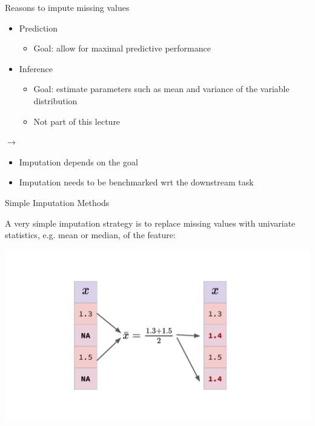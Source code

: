 \documentclass[11pt,compress,t,notes=noshow, xcolor=table]{beamer}
\begin{document}
\begin{frame}{Reasons to impute missing values}
    \vfill
    \begin{itemize}
        \item Prediction
        \begin{itemize}
            \item Goal: allow for maximal predictive performance
        \end{itemize}
        \item Inference
        \begin{itemize}
            \item Goal: estimate parameters such as mean and variance of the variable distribution
            \item Not part of this lecture
        \end{itemize}
    \end{itemize}
    \vfill
    $\rightarrow$ 
    \begin{itemize}
        \item Imputation depends on the goal
        \item Imputation needs to be benchmarked wrt the downstream task
    \end{itemize}
    \vfill
\end{frame}

\begin{frame}{Simple Imputation Methods}

    A very simple imputation strategy is to replace missing values with univariate statistics, e.g. mean or median, of the feature:
    
    \begin{center}
        \includegraphics[width=\textwidth]{figure_man/fe_imputation_simple.pdf}
    \end{center}

\end{frame}
\end{document}
